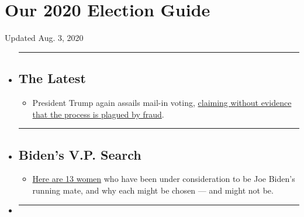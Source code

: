 \hypertarget{our-2020-election-guide}{%
\section{Our 2020 Election Guide}\label{our-2020-election-guide}}

Updated Aug. 3, 2020

\begin{itemize}
\item
  \begin{center}\rule{0.5\linewidth}{\linethickness}\end{center}

  \hypertarget{the-latest}{%
  \subsection{The Latest}\label{the-latest}}

  \begin{itemize}
  \tightlist
  \item
    President Trump again assails mail-in voting,
    \href{https://www.nytimes3xbfgragh.onion/2020/08/03/us/politics/trump-mail-in-voting.html?action=click\&pgtype=Article\&state=default\&region=BELOW_MAIN_CONTENT\&context=storylines_guide}{claiming
    without evidence that the process is plagued by fraud}.
  \end{itemize}
\item
  \begin{center}\rule{0.5\linewidth}{\linethickness}\end{center}

  \hypertarget{bidens-vp-search}{%
  \subsection{Biden's V.P. Search}\label{bidens-vp-search}}

  \begin{itemize}
  \tightlist
  \item
    \href{https://www.nytimes3xbfgragh.onion/article/biden-vice-president-2020.html?action=click\&pgtype=Article\&state=default\&region=BELOW_MAIN_CONTENT\&context=storylines_guide}{Here
    are 13 women} who have been under consideration to be Joe Biden's
    running mate, and why each might be chosen --- and might not be.
  \end{itemize}
\item
  \begin{center}\rule{0.5\linewidth}{\linethickness}\end{center}


\end{itemize}

